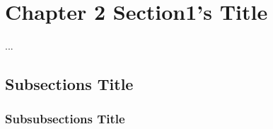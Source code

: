 \section{Chapter 2 Section1's Title}
...
\subsection{Subsections Title}
\subsubsection{Subsubsections Title}
